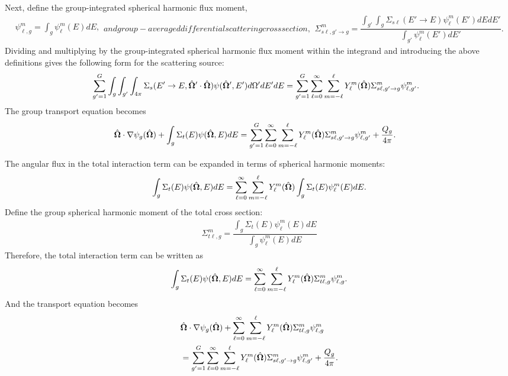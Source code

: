 Next, define the group-integrated spherical harmonic flux moment,
\begin{subequations}
\begin{align}
  \psi_{\ell,g}^m = \int_g \psi_\ell^m(E) dE,
\end{align}
and group-averaged differential scattering cross section,
\begin{align}
  \Sigma_{s\ell,g'\rightarrow g}^m = \dfrac{ \displaystyle\int_{g'} \int_g  \Sigma_{s\ell}(E' \rightarrow E) \psi_\ell^m(E') dE dE' }{ \displaystyle\int_{g'} \psi_\ell^m(E') dE' } .
\end{align}
\end{subequations}
Dividing and multiplying by the group-integrated spherical harmonic flux moment within the integrand and introducing the above definitions gives the following form for the scattering source:
\begin{align}
   &\sum_{g'=1}^G \int_g \int_{g'} \int_{4\pi} \Sigma_s(E' \rightarrow E, \hat{\mathbf{\Omega}}' \cdot \hat{\mathbf{\Omega}}) \psi(\hat{\mathbf{\Omega}}',E') d\Omega' dE' dE = \sum_{g'=1}^G \sum_{\ell=0}^\infty \sum_{m=-\ell}^\ell Y_\ell^m(\hat{\mathbf{\Omega}}) \Sigma_{s\ell,g'\rightarrow g}^m  \psi_{\ell,g'}^m .
\end{align}
The group transport equation becomes
\begin{align}
  &\hat{\mathbf{\Omega}} \cdot \nabla \psi_g(\hat{\mathbf{\Omega}}) + \int_g \Sigma_t(E) \psi(\hat{\mathbf{\Omega}},E) dE = \sum_{g'=1}^G \sum_{\ell=0}^\infty \sum_{m=-\ell}^\ell Y_\ell^m(\hat{\mathbf{\Omega}}) \Sigma_{s\ell,g'\rightarrow g}^m  \psi_{\ell,g'}^m + \frac{Q_g}{4\pi}.
\end{align}

The angular flux in the total interaction term can be expanded in terms of spherical harmonic moments:
\begin{align}
  \int_g \Sigma_t(E) \psi(\hat{\mathbf{\Omega}},E) dE = \sum_{\ell=0}^\infty \sum_{m=-\ell}^\ell Y_\ell^m(\hat{\mathbf{\Omega}}) \int_g \Sigma_t(E) \psi_\ell^m(E) dE.
\end{align}
Define the group spherical harmonic moment of the total cross section:
\begin{align}
  \Sigma_{t\ell,g}^m =  \dfrac{ \displaystyle\int_g  \Sigma_{t}(E) \psi_\ell^m(E) dE }{ \displaystyle\int_{g} \psi_\ell^m(E) dE }
\end{align}
Therefore, the total interaction term can be written as
\begin{align}
  \int_g \Sigma_t(E) \psi(\hat{\mathbf{\Omega}},E) dE = \sum_{\ell=0}^\infty \sum_{m=-\ell}^\ell Y_\ell^m(\hat{\mathbf{\Omega}}) \Sigma_{t\ell,g}^m \psi_{\ell,g}^m.
\end{align}
And the transport equation becomes
\begin{align}
  &\hat{\mathbf{\Omega}} \cdot \nabla \psi_g(\hat{\mathbf{\Omega}}) + \sum_{\ell=0}^\infty \sum_{m=-\ell}^\ell Y_\ell^m(\hat{\mathbf{\Omega}}) \Sigma_{t\ell,g}^m \psi_{\ell,g}^m \nonumber \\*
  &= \sum_{g'=1}^G \sum_{\ell=0}^\infty \sum_{m=-\ell}^\ell Y_\ell^m(\hat{\mathbf{\Omega}}) \Sigma_{s\ell,g'\rightarrow g}^m  \psi_{\ell,g'}^m + \frac{Q_g}{4\pi}.
\end{align}


